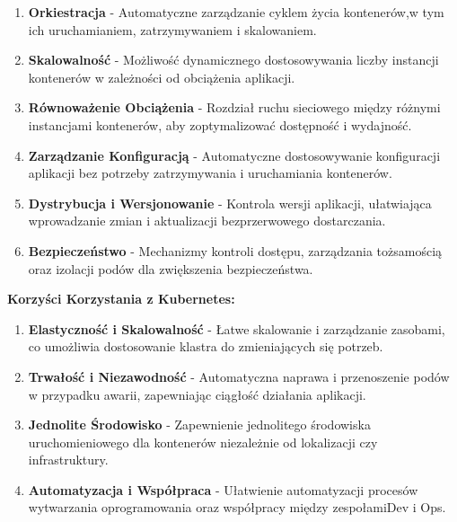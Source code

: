 \begin{enumerate}
\item {\bf Orkiestracja}
   - Automatyczne zarządzanie cyklem życia kontenerów,\linebreak w tym ich uruchamianiem, zatrzymywaniem i skalowaniem.

\item {\bf Skalowalność}
   - Możliwość dynamicznego dostosowywania liczby instancji kontenerów w zależności od obciążenia aplikacji.

\item {\bf Równoważenie Obciążenia}
   - Rozdział ruchu sieciowego między różnymi instancjami kontenerów, aby zoptymalizować dostępność i wydajność.

\item {\bf Zarządzanie Konfiguracją}
   - Automatyczne dostosowywanie konfiguracji aplikacji bez potrzeby zatrzymywania i uruchamiania kontenerów.

\item {\bf Dystrybucja i Wersjonowanie}
   - Kontrola wersji aplikacji, ułatwiająca wprowadzanie zmian i aktualizacji bezprzerwowego dostarczania.

\item {\bf Bezpieczeństwo}
   - Mechanizmy kontroli dostępu, zarządzania tożsamością oraz izolacji podów dla zwiększenia bezpieczeństwa.
\end{enumerate}

{\bf Korzyści Korzystania z Kubernetes:}

\begin{enumerate}
\item {\bf Elastyczność i Skalowalność}
   - Łatwe skalowanie i zarządzanie zasobami, co umożliwia dostosowanie klastra do zmieniających się potrzeb.

\item {\bf Trwałość i Niezawodność}
   - Automatyczna naprawa i przenoszenie podów w przypadku awarii, zapewniając ciągłość działania aplikacji.

\item {\bf Jednolite Środowisko}
   - Zapewnienie jednolitego środowiska uruchomieniowego dla kontenerów niezależnie od lokalizacji czy infrastruktury.

\item {\bf Automatyzacja i Współpraca}
   - Ułatwienie automatyzacji procesów wytwarzania oprogramowania oraz współpracy między zespołami\linebreak Dev i Ops.
\end{enumerate}

